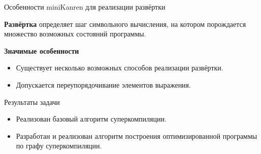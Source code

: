\documentclass[xcolor=table]{beamer}
\begin{document}
\begin{frame}{Особенности miniKanren для реализации развёртки}
\begin{block}{}
{\bf Развёртка} определяет шаг символьного вычисления,
на котором порождается множество возможных состояний программы.
\end{block}
\vspace{0.5cm}
\begin{block}
{\bf Значимые особенности}
\begin{itemize}
\item Существует несколько возможных способов реализации развёртки.
\item Допускается переупорядочивание элементов выражения.
\end{itemize}
\end{block}
\end{frame}

\begin{frame}{Результаты задачи}
\begin{itemize}
\item Реализован базовый алгоритм суперкомпиляции.
\item Разработан и реализован алгоритм построения оптимизированной программы по графу суперкомпиляции.
\end{itemize}
\end{frame}
\end{document}

